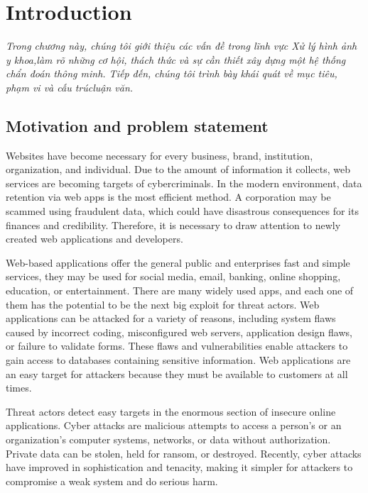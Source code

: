 \chapter{Introduction}
\label{chap:introduction}
	\textit{Trong chương này, chúng tôi giới thiệu các vấn đề trong lĩnh vực Xử lý hình ảnh y khoa,\linebreak làm rõ những cơ hội, thách thức và sự cần thiết xây dựng một hệ thống chẩn đoán thông minh. Tiếp đến, chúng tôi trình bày khái quát về mục tiêu, phạm vi và cấu trúc\linebreak luận văn.}
\minitoc

\section{Motivation and problem statement}
\label{sec:motivation}
Websites have become necessary for every business, brand, institution, organization, and individual. Due to the amount of information it collects, web services are becoming targets of cybercriminals. In the modern environment, data retention via web apps is the most efficient method. A corporation may be scammed using fraudulent data, which could have disastrous consequences for its finances and credibility.  Therefore, it is necessary to draw attention to newly created web applications and developers.

Web-based applications offer the general public and enterprises fast and simple services, they may be used for social media, email, banking, online shopping, education, or entertainment. There are many widely used apps, and each one of them has the potential to be the next big exploit for threat actors. Web applications can be attacked for a variety of reasons, including system flaws caused by incorrect coding, misconfigured web servers, application design flaws, or failure to validate forms. These flaws and vulnerabilities enable attackers to gain access to databases containing sensitive information. Web applications are an easy target for attackers because they must be available to customers at all times.

Threat actors detect easy targets in the enormous section of insecure online applications. Cyber attacks are malicious attempts to access a person's or an organization's computer systems, networks, or data without authorization. Private data can be stolen, held for ransom, or destroyed. Recently, cyber attacks have improved in sophistication and tenacity, making it simpler for attackers to compromise a weak system and do serious harm.

